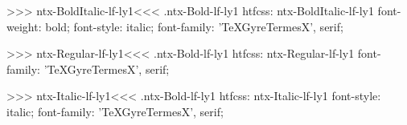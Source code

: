 >>>
\<ntx-BoldItalic-lf-ly1\><<<
.ntx-Bold-lf-ly1
htfcss:  ntx-BoldItalic-lf-ly1  font-weight: bold; font-style: italic; font-family: 'TeXGyreTermesX', serif;

>>>
\<ntx-Regular-lf-ly1\><<<
.ntx-Bold-lf-ly1
htfcss:  ntx-Regular-lf-ly1  font-family: 'TeXGyreTermesX', serif;

>>>
\<ntx-Italic-lf-ly1\><<<
.ntx-Bold-lf-ly1
htfcss:  ntx-Italic-lf-ly1  font-style: italic; font-family: 'TeXGyreTermesX', serif;

